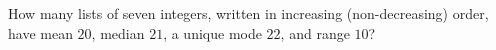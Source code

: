 How many lists of seven integers, written in increasing (non-decreasing) order, have mean $20$, median $21$, a unique mode $22$, and range $10$?
